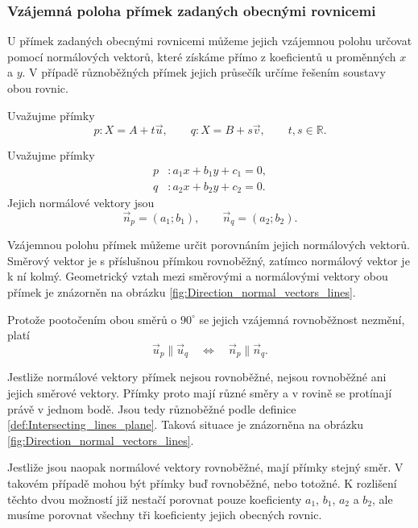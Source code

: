 \subsubsection{Vzájemná poloha přímek zadaných obecnými rovnicemi}
\label{subsubsec:Relative_position_general_lines}

U přímek zadaných obecnými rovnicemi můžeme jejich vzájemnou polohu
určovat pomocí normálových vektorů, které získáme přímo z koeficientů
u proměnných $x$ a $y$. V případě různoběžných přímek jejich průsečík
určíme řešením soustavy obou rovnic.

Uvažujme přímky
\[
    p:X=A+t\vec{u},
    \qquad
    q:X=B+s\vec{v},
    \qquad
    t,s\in\mathbb{R}.
\]

Uvažujme přímky
\begin{align}
    p &: a_1x+b_1y+c_1=0,
    \label{eq:General_line_p_relative_position}\\
    q &: a_2x+b_2y+c_2=0.
    \label{eq:General_line_q_relative_position}
\end{align}
Jejich normálové vektory jsou
\[
    \vec{n}_p=(a_1;b_1),
    \qquad
    \vec{n}_q=(a_2;b_2).
\]

Vzájemnou polohu přímek můžeme určit porovnáním jejich normálových
vektorů. Směrový vektor je s příslušnou přímkou rovnoběžný, zatímco
normálový vektor je k ní kolmý. Geometrický vztah mezi směrovými
a normálovými vektory obou přímek je znázorněn na obrázku
\ref{fig:Direction_normal_vectors_lines}.

Protože pootočením obou směrů o $90^\circ$ se jejich vzájemná
rovnoběžnost nezmění, platí
\[
    \vec{u}_p\parallel\vec{u}_q
    \quad\Longleftrightarrow\quad
    \vec{n}_p\parallel\vec{n}_q.
\]

Jestliže normálové vektory přímek nejsou rovnoběžné, nejsou rovnoběžné
ani jejich směrové vektory. Přímky proto mají různé směry a v rovině
se protínají právě v jednom bodě. Jsou tedy různoběžné podle definice
\ref{def:Intersecting_lines_plane}. Taková situace je znázorněna
na obrázku \ref{fig:Direction_normal_vectors_lines}.

Jestliže jsou naopak normálové vektory rovnoběžné, mají přímky stejný
směr. V takovém případě mohou být přímky buď rovnoběžné, nebo totožné.
K rozlišení těchto dvou možností již nestačí porovnat pouze koeficienty
$a_1$, $b_1$, $a_2$ a $b_2$, ale musíme porovnat všechny tři
koeficienty jejich obecných rovnic.

